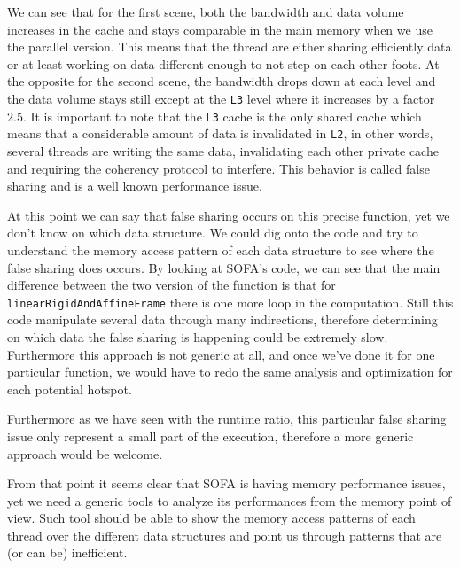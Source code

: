 We can see that for the first scene, both the bandwidth and data
volume increases in the cache and stays comparable in the main memory when we
use the parallel version. This means that the thread are either sharing
efficiently data or at least working on data different enough to not step on
each other foots. At the opposite for the second scene, the bandwidth drops
down at each level and the data volume stays still except at the \texttt{L3}
level where it increases by a factor $2.5$. It is important to note that the
\texttt{L3} cache is the only shared cache which means that a considerable
amount of data is invalidated in \texttt{L2}, in other words, several threads
are writing the same data, invalidating each other private cache and requiring
the coherency protocol to interfere. This behavior is called false sharing and
is a well known performance issue.

At this point we can say that false sharing occurs on this precise function,
yet we don't know on which data structure. We could dig onto the code and try
to understand the memory access pattern of each data structure to see where
the false sharing does occurs. By looking at \gls{SOFA}'s code, we can see
that the main difference between the two version of the function is that for
\texttt{linearRigidAndAffineFrame} there is one more loop in the computation.
Still this code manipulate several data through many indirections, therefore
determining on which data the false sharing is happening could be extremely
slow. Furthermore this approach is not generic at all, and once we've done it
for one particular function, we would have to redo the same analysis and
optimization for each potential hotspot.

Furthermore as we have seen with the runtime ratio, this particular false
sharing issue only represent a small part of the execution, therefore a more
generic approach would be welcome.

From that point it seems clear that \gls{SOFA} is having memory performance
issues, yet we need a generic tools to analyze its performances from the
memory point of view. Such tool should be able to show the memory access
patterns of each thread over the different data structures and point us
through patterns that are (or can be) inefficient.
